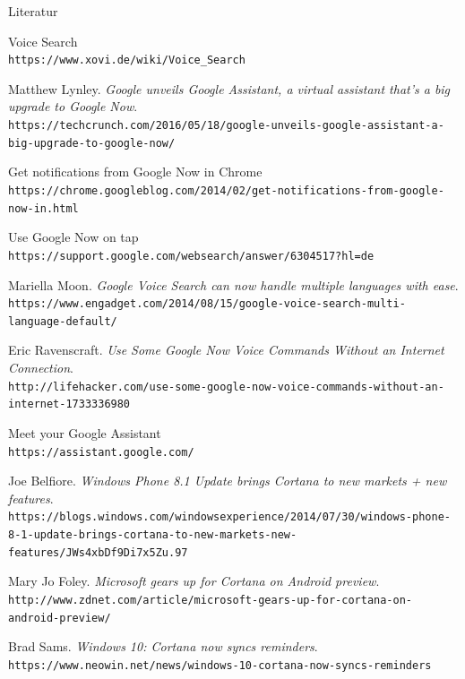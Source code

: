 \documentclass[18pt]{beamer}
\begin{document}
\begin{frame}[allowframebreaks]{Literatur}
\begin{thebibliography}{9}
		Voice Search
		\\\texttt{https://www.xovi.de/wiki/Voice\_Search}
		
		Matthew Lynley.
		\textit{Google unveils Google Assistant, a virtual assistant that’s a big upgrade to Google Now}.
		\\\texttt{https://techcrunch.com/2016/05/18/google-unveils-google-assistant-a-big-upgrade-to-google-now/}
		
		Get notifications from Google Now in Chrome 
		\\\texttt{https://chrome.googleblog.com/2014/02/get-notifications-from-google-now-in.html}
		
		Use Google Now on tap
		\\\texttt{https://support.google.com/websearch/answer/6304517?hl=de}
		
		Mariella Moon.
		\textit{Google Voice Search can now handle multiple languages with ease}.
		\\\texttt{https://www.engadget.com/2014/08/15/google-voice-search-multi-language-default/}
		
		Eric Ravenscraft.
		\textit{Use Some Google Now Voice Commands Without an Internet Connection}.
		\\\texttt{http://lifehacker.com/use-some-google-now-voice-commands-without-an-internet-1733336980}
		
		Meet your Google Assistant
		\\\texttt{https://assistant.google.com/}
		
		Joe Belfiore.
		\textit{Windows Phone 8.1 Update brings Cortana to new markets + new features}.
		\\\texttt{https://blogs.windows.com/windowsexperience/2014/07/30/windows-phone-8-1-update-brings-cortana-to-new-markets-new-features/JWs4xbDf9Di7x5Zu.97}
		
		Mary Jo Foley.
		\textit{Microsoft gears up for Cortana on Android preview}.
		\\\texttt{http://www.zdnet.com/article/microsoft-gears-up-for-cortana-on-android-preview/}
		
		Brad Sams.
		\textit{Windows 10: Cortana now syncs reminders}.
		\\\texttt{https://www.neowin.net/news/windows-10-cortana-now-syncs-reminders}
		

\end{thebibliography}
\end{frame}
\end{document}
